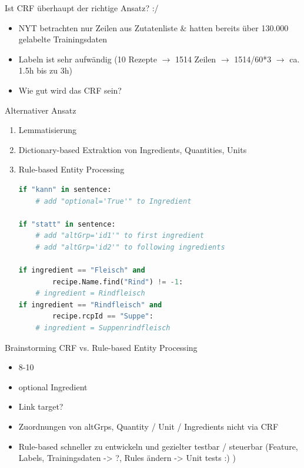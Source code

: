 \documentclass[12pt]{beamer}
\begin{document}
\begin{frame}{Ist CRF überhaupt der richtige Ansatz? :/}
	\begin{itemize}
		\item NYT betrachten nur Zeilen aus Zutatenliste \& hatten bereits über 130.000 gelabelte Trainingsdaten
		\item Labeln ist sehr aufwändig (10 Rezepte $\rightarrow$ 1514 Zeilen $\rightarrow$ 1514/60*3 $\rightarrow$ ca. 1.5h bis zu 3h)
		\item Wie gut wird das CRF sein?
	\end{itemize}
\end{frame}


\begin{frame}[fragile]{Alternativer Ansatz}
	\begin{enumerate}
		\item Lemmatisierung
		\item Dictionary-based Extraktion von Ingredients, Quantities, Units
		\item Rule-based Entity Processing
		\begin{lstlisting}[language=Python]
if "kann" in sentence:
	# add "optional='True'" to Ingredient

if "statt" in sentence:
	# add "altGrp='id1'" to first ingredient
	# add "altGrp='id2'" to following ingredients  
	
if ingredient == "Fleisch" and
		recipe.Name.find("Rind") != -1:
	# ingredient = Rindfleisch
if ingredient == "Rindfleisch" and
		recipe.rcpId == "Suppe":
	# ingredient = Suppenrindfleisch
		\end{lstlisting}
	\end{enumerate}
\end{frame}


\begin{frame}{Brainstorming CRF vs. Rule-based Entity Processing}
	\begin{itemize}
		\item 8-10
		\item optional Ingredient
		\vspace{0.5cm}
		\item Link target?
		\item Zuordnungen von altGrps, Quantity / Unit / Ingredients nicht via CRF
		\item Rule-based schneller zu entwickeln und gezielter testbar / steuerbar (Feature, Labels, Trainingsdaten -> ?, Rules ändern -> Unit tests :) )
	\end{itemize}
\end{frame}
\end{document}
